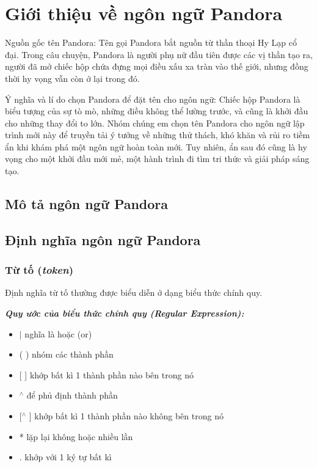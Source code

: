 \section{Giới thiệu về ngôn ngữ Pandora}
Nguồn gốc tên Pandora: 
    Tên gọi Pandora bắt nguồn từ thần thoại 
    Hy Lạp cổ đại. Trong câu chuyện, Pandora là người phụ nữ đầu tiên được 
    các vị thần tạo ra, người đã mở chiếc hộp chứa đựng mọi điều xấu xa tràn 
    vào thế giới, nhưng đồng thời hy vọng vẫn còn ở lại trong đó.

Ý nghĩa và lí do chọn Pandora để đặt tên cho ngôn ngữ: 
    Chiếc hộp Pandora là biểu tượng của sự tò mò, những điều không thể 
    lường trước, và cũng là khởi đầu cho những thay đổi to lớn. Nhóm chúng 
    em chọn tên Pandora cho ngôn ngữ lập trình mới này để truyền tải ý 
    tưởng về những thử thách, khó khăn và rủi ro tiềm ẩn khi khám phá một 
    ngôn ngữ hoàn toàn mới. Tuy nhiên, ẩn sau đó cũng là hy vọng cho một 
    khởi đầu mới mẻ, một hành trình đi tìm tri thức và giải pháp sáng tạo.


\subsection{Mô tả ngôn ngữ Pandora}
\subsection{Định nghĩa ngôn ngữ Pandora}
\subsubsection{Từ tố (\textit{token})}
Định nghĩa từ tố thường được biểu diễn ở dạng biểu thức chính quy\cite{li2008regular}.

\textbf{\textit{Quy ước của biểu thức chính quy (Regular Expression):}}

\begin{itemize}
    \item{$|$ nghĩa là hoặc (or)}
    \item{( ) nhóm các thành phần}
    \item{[ ] khớp bất kì 1 thành phần nào bên trong nó}
    \item{$^\wedge$ để phủ định thành phần}
    \item{[$^\wedge$ ] khớp bất kì 1 thành phần nào không bên trong nó}
    \item{* lặp lại không hoặc nhiều lần}
    \item{. khớp với 1 ký tự bất kì}
\end{itemize}

